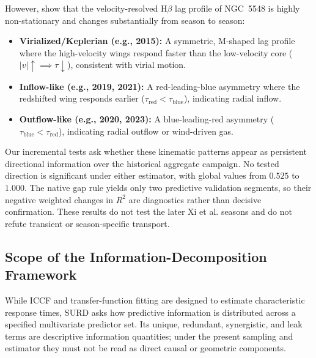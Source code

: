 \documentclass[fleqn,usenatbib]{mnras}
\begin{document}
However, \citet{Xi2025} show that the velocity-resolved H\(\beta\) lag profile of NGC~5548 is highly non-stationary and changes substantially from season to season:
\begin{itemize}
    \item \textbf{Virialized/Keplerian (e.g., 2015):} A symmetric, M-shaped lag profile where the high-velocity wings respond faster than the low-velocity core ($|v| \uparrow \implies \tau \downarrow$), consistent with virial motion.
    \item \textbf{Inflow-like (e.g., 2019, 2021):} A red-leading-blue asymmetry where the redshifted wing responds earlier ($\tau_{\mathrm{red}} < \tau_{\mathrm{blue}}$), indicating radial inflow.
    \item \textbf{Outflow-like (e.g., 2020, 2023):} A blue-leading-red asymmetry ($\tau_{\mathrm{blue}} < \tau_{\mathrm{red}}$), indicating radial outflow or wind-driven gas.
\end{itemize}
Our incremental tests ask whether these kinematic patterns appear as persistent directional information over the historical aggregate campaign. No tested direction is significant under either estimator, with global values from $0.525$ to $1.000$. The native gap rule yields only two predictive validation segments, so their negative weighted changes in $R^2$ are diagnostics rather than decisive confirmation. These results do not test the later Xi et al. seasons and do not refute transient or season-specific transport.

\subsection{Scope of the Information-Decomposition Framework}
\label{sec:novelty_framework}

While ICCF and transfer-function fitting are designed to estimate characteristic response times, SURD asks how predictive information is distributed across a specified multivariate predictor set. Its unique, redundant, synergistic, and leak terms are descriptive information quantities; under the present sampling and estimator they must not be read as direct causal or geometric components.
\end{document}

